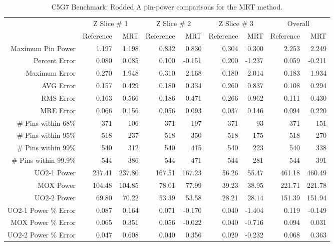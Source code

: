 {{{{        \begin{table}[htbp]
          \centering
          \caption{C5G7 Benchmark: Rodded A pin-power comparisons for the MRT method. \label{tab:MR:C5G7:Rodded A-MRT}}
          \scriptsize
          \begin{tabular}{rrrrrrrrr}\toprule
                                  & \multicolumn{2}{c}{Z Slice \# 1} & \multicolumn{2}{c}{Z Slice \# 2} & \multicolumn{2}{c}{Z Slice \# 3} & \multicolumn{2}{c}{Overall}\\
                                  & Reference & MRT & Reference & MRT & Reference & MRT & Reference & MRT\\\midrule
            Maximum Pin Power     & 1.197 & 1.198 & 0.832 & 0.830 & 0.304 & 0.300 & 2.253 & 2.249\\
            Percent Error         & 0.080 & 0.085 & 0.100 & -0.151 & 0.200 & -1.237 & 0.059 & -0.211\\\midrule
            Maximum Error         & 0.270 & 1.948 & 0.310 & 2.168 & 0.180 & 2.014 & 0.183 & 1.934\\
            AVG Error             & 0.157 & 0.429 & 0.180 & 0.334 & 0.260 & 0.837 & 0.108 & 0.294\\
            RMS Error             & 0.163 & 0.566 & 0.186 & 0.471 & 0.266 & 0.962 & 0.111 & 0.430\\
            MRE Error             & 0.066 & 0.156 & 0.056 & 0.093 & 0.037 & 0.146 & 0.094 & 0.220\\\midrule
            \# Pins within 68\%   & 371 & 106 & 371 & 197 & 371 & 93 & 371 & 151\\
            \# Pins within 95\%   & 518 & 237 & 518 & 350 & 518 & 175 & 518 & 270\\
            \# Pins within 99\%   & 540 & 312 & 540 & 415 & 540 & 223 & 540 & 338\\
            \# Pins within 99.9\% & 544 & 386 & 544 & 471 & 544 & 281 & 544 & 391\\\midrule
            UO2-1 Power           & 237.41 & 237.80 & 167.51 & 167.23 & 56.26 & 55.47 & 461.18 & 460.49\\
            MOX Power             & 104.48 & 104.85 & 78.01 & 77.99 & 39.23 & 38.95 & 221.71 & 221.78\\
            UO2-2 Power           & 69.80 & 70.22 & 53.39 & 53.58 & 28.21 & 28.14 & 151.39 & 151.94\\
            UO2-1 Power \% Error  & 0.087 & 0.164 & 0.071 & -0.170 & 0.040 & -1.404 & 0.119 & -0.149\\
            MOX Power \% Error    & 0.065 & 0.351 & 0.056 & -0.022 & 0.040 & -0.716 & 0.094 & 0.031\\
            UO2-2 Power \% Error  & 0.047 & 0.608 & 0.040 & 0.356 & 0.029 & -0.232 & 0.068 & 0.363\\\bottomrule
          \end{tabular}
        \end{table}

}}}}
